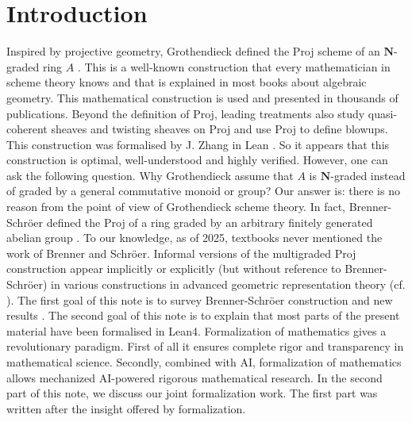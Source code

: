 \documentclass[graybox]{svmult}
\begin{document}
\section*{Introduction}
Inspired by projective geometry, Grothendieck defined the Proj scheme of an $\mathbf{N}$-graded ring $A$ \cite{Gr61}. This is a well-known construction that every mathematician in scheme theory knows and that is explained in most books about algebraic geometry. This mathematical construction is used and presented in thousands of publications. 
Beyond the definition of Proj, leading treatments also study quasi-coherent sheaves and twisting sheaves on Proj and use Proj to define blowups.  
This construction was formalised by J. Zhang in Lean \cite{Z23}. 
So it appears that this construction is optimal, well-understood and highly verified.  
However, one can ask the following question. Why Grothendieck assume that $A$ is $\mathbf{N}$-graded instead of graded by a general commutative monoid or group? 
Our answer is: there is no reason from the point of view of Grothendieck scheme theory. In fact, Brenner-Schröer defined the Proj of a ring graded by an arbitrary finitely generated abelian group \cite{BS03}.
To our knowledge, as of 2025, textbooks never mentioned the work of Brenner and Schröer.
 Informal versions of the multigraded Proj construction appear implicitly or
explicitly (but without reference to Brenner-Schröer) in various constructions in advanced geometric representation theory (cf. \cite{MR24}).
The first goal of this note is to survey Brenner-Schröer construction and new results \cite{BS03, MR24, MZ25}. The second goal of this note is to explain that most parts of the present material have been formalised in Lean4. Formalization of mathematics gives a revolutionary paradigm. First of all it ensures complete rigor and transparency in mathematical science. Secondly, combined with AI, formalization of mathematics allows mechanized AI-powered rigorous mathematical research. In the second part of this note, we discuss our joint formalization work. The first part was written after the insight offered by formalization. 
\end{document}
